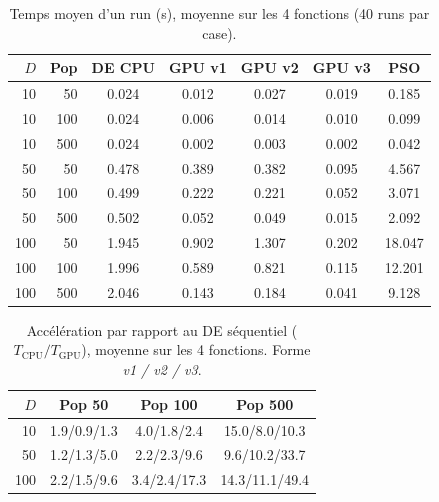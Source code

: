 \begin{table}[!t]\centering\scriptsize\setlength{\tabcolsep}{2pt}\caption{Temps moyen d'un run (s), moyenne sur les 4 fonctions (40 runs par case).}\label{tab:temps}
\begin{tabular}{rr|ccccc}\toprule $D$ & Pop & DE CPU & GPU v1 & GPU v2 & GPU v3 & PSO\\\midrule
10 & 50 & 0.024 & 0.012 & 0.027 & 0.019 & 0.185\\
10 & 100 & 0.024 & 0.006 & 0.014 & 0.010 & 0.099\\
10 & 500 & 0.024 & 0.002 & 0.003 & 0.002 & 0.042\\
\midrule
50 & 50 & 0.478 & 0.389 & 0.382 & 0.095 & 4.567\\
50 & 100 & 0.499 & 0.222 & 0.221 & 0.052 & 3.071\\
50 & 500 & 0.502 & 0.052 & 0.049 & 0.015 & 2.092\\
\midrule
100 & 50 & 1.945 & 0.902 & 1.307 & 0.202 & 18.047\\
100 & 100 & 1.996 & 0.589 & 0.821 & 0.115 & 12.201\\
100 & 500 & 2.046 & 0.143 & 0.184 & 0.041 & 9.128\\
\bottomrule\end{tabular}\end{table}
\begin{table}[!t]\centering\scriptsize\setlength{\tabcolsep}{2pt}\caption{Acc\'el\'eration par rapport au DE s\'equentiel ($T_{\mathrm{CPU}}/T_{\mathrm{GPU}}$), moyenne sur les 4 fonctions. Forme \emph{v1 / v2 / v3}.}\label{tab:speedup}
\begin{tabular}{r|ccc}\toprule $D$ & Pop 50 & Pop 100 & Pop 500\\\midrule
10 & 1.9/0.9/1.3 & 4.0/1.8/2.4 & 15.0/8.0/10.3\\
50 & 1.2/1.3/5.0 & 2.2/2.3/9.6 & 9.6/10.2/33.7\\
100 & 2.2/1.5/9.6 & 3.4/2.4/17.3 & 14.3/11.1/49.4\\
\bottomrule\end{tabular}\end{table}
